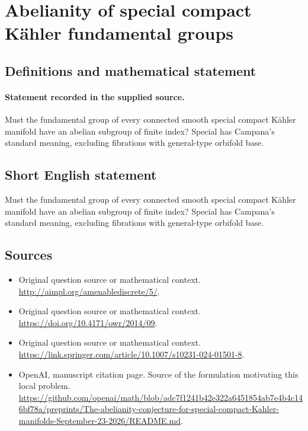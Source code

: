 \documentclass[11pt]{article}
\begin{document}
\section*{Abelianity of special compact Kähler fundamental groups}\label{statement}
\subsection{Definitions and mathematical statement}
\paragraph{Statement recorded in the supplied source.}
Must the fundamental group of every connected smooth special compact Kähler manifold have an abelian subgroup of finite index? Special has Campana's standard meaning, excluding fibrations with general-type orbifold base.
\subsection{Short English statement}
Must the fundamental group of every connected smooth special compact Kähler manifold have an abelian subgroup of finite index? Special has Campana's standard meaning, excluding fibrations with general-type orbifold base.
\subsection{Sources}
\begin{itemize}
\item[S1] Original question source or mathematical context.
\url{http://aimpl.org/amenablediscrete/5/}.
\item[S2] Original question source or mathematical context.
\url{https://doi.org/10.4171/owr/2014/09}.
\item[S3] Original question source or mathematical context.
\url{https://link.springer.com/article/10.1007/s10231-024-01501-8}.
\item[S4] OpenAI, manuscript citation page. Source of the formulation motivating this local problem.
\url{https://github.com/openai/math/blob/adc7f1241b42e322a6451854ab7e4b4c146bf78a/preprints/The-abelianity-conjecture-for-special-compact-Kahler-manifolds-September-23-2026/README.md}.
\end{itemize}
\end{document}
